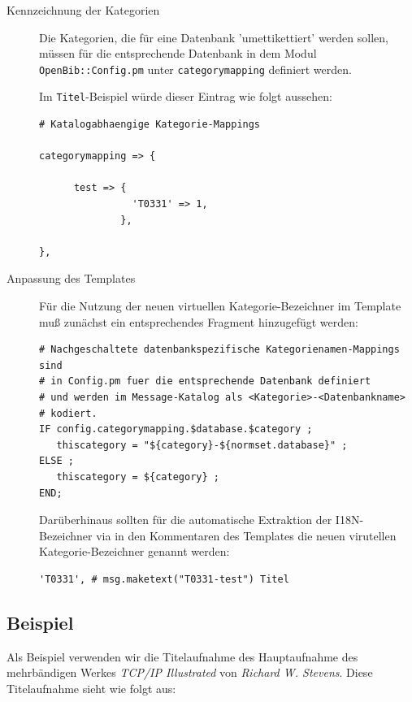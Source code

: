 \documentclass[11pt, twoside, a4paper, BCOR8mm, DIV12, bibtotoc,idxtotoc]{scrbook}
\begin{document}
\begin{description}
\item[Kennzeichnung der Kategorien] Die Kategorien, die für eine
  Datenbank 'umettikettiert' werden sollen, müssen für die
  entsprechende Datenbank in dem Modul \texttt{OpenBib::Config.pm}
  unter \texttt{categorymapping} definiert werden.

  Im \texttt{Titel}-Beispiel würde dieser Eintrag wie folgt aussehen:
  
\begin{verbatim}
# Katalogabhaengige Kategorie-Mappings

categorymapping => {

      test => {
                'T0331' => 1,
              },

},
\end{verbatim}


\item[Anpassung des Templates] Für die Nutzung der neuen virtuellen
  Kategorie-Bezeichner im Template muß zunächst ein entsprechendes Fragment
  hinzugefügt werden:

\begin{verbatim}
# Nachgeschaltete datenbankspezifische Kategorienamen-Mappings sind
# in Config.pm fuer die entsprechende Datenbank definiert
# und werden im Message-Katalog als <Kategorie>-<Datenbankname>
# kodiert.
IF config.categorymapping.$database.$category ;
   thiscategory = "${category}-${normset.database}" ;
ELSE ;
   thiscategory = ${category} ;
END;
\end{verbatim}

  Darüberhinaus sollten für die automatische Extraktion der
  I18N-Bezeichner via  in den Kommentaren des
  Templates  die neuen virutellen
  Kategorie-Bezeichner genannt werden:

\begin{verbatim}
'T0331', # msg.maketext("T0331-test") Titel
\end{verbatim}

\end{description}
\subsection{Beispiel}

Als Beispiel verwenden wir die Titelaufnahme des Hauptaufnahme des
mehrbändigen Werkes \emph{TCP/IP Illustrated} von \emph{Richard W.
  Stevens}. Diese Titelaufnahme sieht wie folgt aus:
\end{document}
